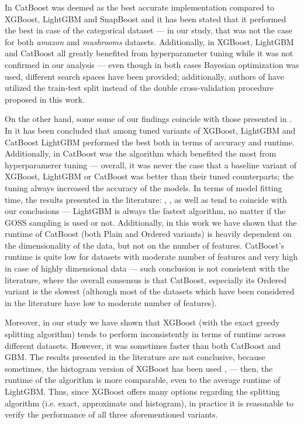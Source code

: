 \documentclass[magisterska, english]{pwr_wmat_praca_dyplomowa}
\theoremstyle{plain}
\numberwithin{theorem}{chapter}
\theoremstyle{definition}
\numberwithin{theorem}{chapter}
\begin{document}
In \cite{competitive_analysis} CatBoost was deemed as the best accurate implementation compared to XGBoost, LightGBM and SnapBoost and it has been stated that it performed the best in case of the categorical dataset --- in our study, that was not the case for both \emph{amazon} and \emph{mushrooms} datasets. Additionally, in \cite{competitive_analysis} XGBoost, LightGBM and CatBoost all greatly benefited from hyperparameter tuning while it was not confirmed in our analysis --- even though in both cases Bayesian optimization was used, different search spaces have been provided; additionally, authors of \cite{competitive_analysis} have utilized the train-test split instead of the double cross-validation procedure proposed in this work.

On the other hand, some some of our findings coincide with those presented in \cite{comparison_of}. In \cite{comparison_of} it has been concluded that among tuned variants of XGBoost, LightGBM and CatBoost LightGBM performed the best both in terms of accuracy and runtime. Additionally, in \cite{comparison_of} CatBoost was the algorithm which benefited the most from hyperparamerer tuning --- overall, it was never the case that a baseline variant of XGBoost, LightGBM or CatBoost was better than their tuned counterparts; the tuning always increased the accuracy of the models.
In terms of model fitting time, the results presented in the literature: \cite{comparative_analysis}, \cite{competitive_analysis}, \cite{comparison_of} as well as \cite{lightgbm} tend to coincide with our conclusions --- LightGBM is always the fastest algorithm, no matter if the GOSS sampling is used or not. Additionally, in this work we have shown that the runtime of CatBoost (both Plain and Ordered variants) is heavily dependent on the dimensionality of the data, but not on the number of features. CatBoost's runtime is quite low for datasets with moderate number of features and very high in case of highly dimensional data --- such conclusion is not consistent with the literature, where the overall consensus is that CatBoost, especially its Ordered variant is the slowest (although most of the datasets which have been considered in the literature have low to moderate number of features).

Moreover, in our study we have shown that XGBoost (with the exact greedy splitting algorithm) tends to perform inconsistently in terms of runtime across different datasets. However, it was sometimes faster than both CatBoost and GBM. The results presented in the literature are not conclusive, because sometimes, the histogram version of XGBoost has been used \cite{lightgbm}, \cite{comparison_of} --- then, the runtime of the algorithm is more comparable, even to the average runtime of LightGBM. Thus, since XGBoost offers many options regarding the splitting algorithm (i.e. exact, approximate and histogram), in practice it is reasonable to verify the performance of all three aforementioned variants.
\end{document}
